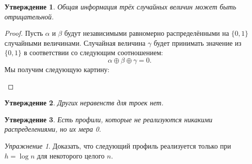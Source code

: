 \documentclass[12pt]{article}
\theoremstyle{definition}
\theoremstyle{plain}
\newtheorem{statement}{Утверждение}[section]
\theoremstyle{remark}
\newtheorem{exercise}{Упражнение}[section]
\begin{document}
\begin{statement}
    Общая информация трёх случайных величин может быть отрицательной.
\end{statement}
\begin{proof}
    Пусть $\alpha$ и $\beta$ будут независимыми равномерно распределёнными на $\{0,1\}$ случайными
    величинами. Случайная величина $\gamma$ будет принимать значение из $\{0,1\}$ в соответствии со
    следующим соотношением:
    \[
        \alpha\oplus\beta\oplus\gamma = 0.
    \]
    Мы получим следующую картину:

    \begin{center}
    \end{center}

\end{proof}
\begin{statement}
    Других неравенств для троек нет.
\end{statement}
\begin{statement}
        Есть профили, которые не реализуются никакими распределениями, но их мера 0.
\end{statement}
\begin{exercise}
    Доказать, что следующий профиль реализуется только при $h=\log n$ для некоторого целого $n$.
    \begin{center}
    \end{center}
\end{exercise}
\end{document}
